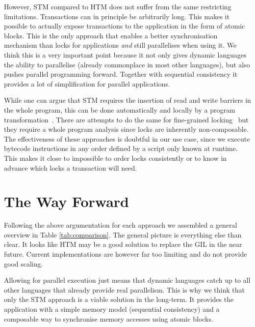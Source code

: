 \documentclass{sigplanconf}
\begin{document}
However, STM compared to HTM does not suffer from the same restricting
limitations. Transactions can in principle be arbitrarily long.  This makes it
possible to actually expose transactions to the application in the
form of atomic blocks. This is the only approach that enables a better
synchronisation mechanism than locks for applications \emph{and} still
parallelises when using it. We think this is a very important point
because it not only gives dynamic languages the ability to parallelise
(already commonplace in most other languages), but also pushes
parallel programming forward. Together with sequential consistency it
provides a lot of simplification for parallel applications.

While one can argue that STM requires the insertion of read and write
barriers in the whole program, this can be done automatically and
locally by a program transformation~\cite{felber07}. There are attempts
to do the same for fine-grained locking~\cite{bill06} but they require
a whole program analysis since locks are inherently non-composable.
The effectiveness of these approaches is doubtful in our use case,
since we execute bytecode instructions in any order defined by a
script only known at runtime. This makes it close to impossible to
order locks consistently or to know in advance which locks a
transaction will need.




\section{The Way Forward}


Following the above argumentation for each approach we assembled a
general overview in Table \ref{tab:comparison}. The general picture is
everything else than clear. It looks like HTM may be a good solution
to replace the GIL in the near future. Current implementations are
however far too limiting and do not provide good scaling.

Allowing for parallel execution just means that dynamic languages
catch up to all other languages that already provide real
parallelism. This is why we think that only the STM approach is a
viable solution in the long-term. It provides the application with a
simple memory model (sequential consistency) and a composable way to
synchronise memory accesses using atomic blocks.
\end{document}
